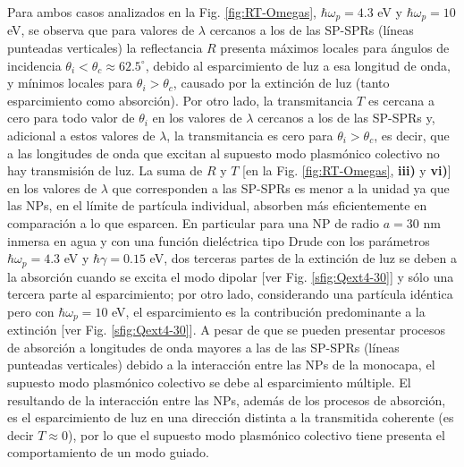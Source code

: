 Para ambos casos analizados en la Fig. \ref{fig:RT-Omegas}, $\hbar\omega_p = 4.3$ eV y $\hbar\omega_p = 10$ eV, se observa que para valores de $\lambda$ cercanos a los de las SP-SPRs (líneas punteadas verticales) la reflectancia $R$ presenta máximos locales para ángulos de incidencia $\theta_i<\theta_c \approx 62.5^\circ$, debido al esparcimiento de luz a esa longitud de onda, y mínimos locales para $\theta_i>\theta_c$, causado por la extinción de luz (tanto esparcimiento como absorción). Por otro lado, la transmitancia $T$ es cercana a cero para todo valor de $\theta_i$ en los valores de $\lambda$ cercanos a los de las SP-SPRs y, adicional a estos valores de $\lambda$, la transmitancia es cero para $\theta_i>\theta_c$, es decir, que a las longitudes de onda que excitan al supuesto modo plasmónico colectivo no hay transmisión de luz. La suma de $R$ y $T$ [en la Fig. \ref{fig:RT-Omegas}, \textbf{iii)} y \textbf{vi)}] en los valores de $\lambda$ que corresponden a las SP-SPRs es menor a la unidad ya que las NPs, en el límite de partícula individual, absorben más eficientemente en comparación a lo que esparcen. En particular para una NP de radio $a=30$ nm inmersa en agua y con una función dieléctrica tipo Drude con los parámetros $\hbar\omega_p=4.3$ eV  y $\hbar\gamma=0.15$ eV, dos terceras partes de la extinción de luz se deben a la absorción  cuando se excita el modo dipolar [ver Fig. \ref{sfig:Qext4-30}] y sólo una tercera parte al esparcimiento; por otro lado, considerando una partícula idéntica pero con $\hbar\omega_p = 10$ eV, el esparcimiento es la contribución predominante a la extinción [ver Fig. \ref{sfig:Qext4-30}]. A pesar de que se pueden presentar procesos de  absorción a longitudes de onda mayores a las de las SP-SPRs (líneas punteadas verticales) debido a la interacción entre las NPs de la monocapa, el supuesto modo plasmónico colectivo se debe al esparcimiento múltiple. El resultando de la interacción entre las NPs, además de los procesos de absorción, es el esparcimiento de luz en una dirección distinta a la transmitida coherente (es decir $T\approx 0$), por lo que el supuesto modo plasmónico colectivo tiene presenta el comportamiento de un modo guiado.

